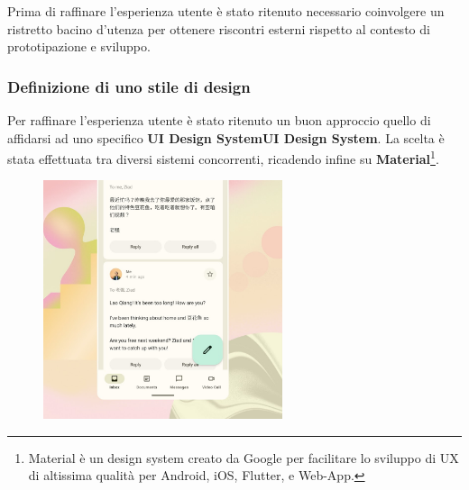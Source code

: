 \documentclass{natourDoc}
\begin{document}
Prima di raffinare l'esperienza utente è stato ritenuto necessario coinvolgere un ristretto bacino d'utenza per ottenere riscontri esterni
rispetto al contesto di prototipazione e sviluppo.

\newpage
\subsubsection{Definizione di uno stile di design}
Per raffinare l'esperienza utente è stato ritenuto un buon approccio quello di affidarsi ad uno specifico \textbf{UI Design System\Gls{UI Design System}}.
La scelta è stata effettuata tra diversi sistemi concorrenti, ricadendo infine su
\textbf{Material}\footnote{Material è un design system creato da Google per facilitare lo sviluppo di UX di altissima qualità per Android, iOS, Flutter, e Web-App.}.

\FloatBarrier
\begin{figure}[htbp!]
	\centering
	\includegraphics[height=7cm]{usability/material3.jpg}
\end{figure}
\FloatBarrier
\end{document}
